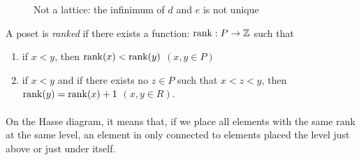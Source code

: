 \begin{figure}[H]
  \begin{center}
    \caption{Not a lattice: the infinimum of $d$ and $e$ is not unique}
  \end{center}
\end{figure}

\begin{definition}
\end{definition}

\begin{definition}
  A poset is \textit{ranked} if there exists a function: $\operatorname{rank} : P \to \mathbb Z$ such that
  \begin{enumerate}
    \item if $x < y$, then $\operatorname{rank}(x) < \operatorname{rank}(y)$ $(x, y \in P)$
    \item if $x < y$ and if there exists no $z \in P$ such that $x < z < y$, then $\operatorname{rank}(y) = \operatorname{rank}(x) + 1$ $(x, y \in R)$.
  \end{enumerate}
\end{definition}

\paragraph{}
On the Hasse diagram, it means that, if we place all elements with the same rank at the same level, an element in only connected to elements placed the level just above or just under itself.


